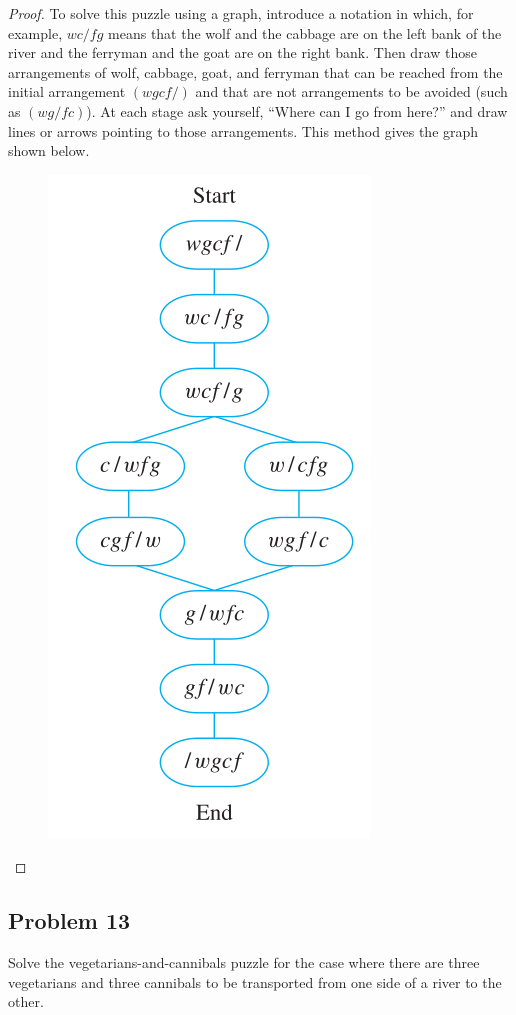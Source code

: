 \documentclass[14pt]{extarticle}
\begin{document}
\begin{proof}
To solve this puzzle using a graph, introduce a notation in which, for example,
$wc / fg$ means that the wolf and the cabbage are on the left bank of the river
and the ferryman and the goat are on the right bank. Then draw those
arrangements of wolf, cabbage, goat, and ferryman that can be reached from the
initial arrangement $(wgcf /)$ and that are not arrangements to be avoided
(such as $(wg / fc)$). At each stage ask yourself, “Where can I go from here?”
and draw lines or arrows pointing to those arrangements. This method gives the
graph shown below.

\begin{figure}[ht!]
\centering
\includegraphics[scale=0.38]{../images/1.4.12.sol.png}
\end{figure}
\end{proof}

\subsection{Problem 13}
Solve the vegetarians-and-cannibals puzzle for the case where there are three
vegetarians and three cannibals to be transported from one side of a river to
the other.
\end{document}
